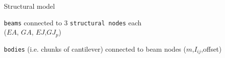 \documentclass[10pt,t]{beamer}
\begin{document}
\begin{frame}{Structural model}

  \vspace{0.5cm}
  \begin{description}
  \itemsep 10pt

  \item[structural elements] \textcolor{dorange}{\texttt{beams}} connected to 3 \textcolor{dorange}{\texttt{structural nodes}} each \\ ($EA$, $GA$, $EJ$,$GJ_p$)\\
  \item[inertial elements] \textcolor{dorange}{\texttt{bodies}} (i.e. chunks of cantilever) connected to beam nodes ($m$,$I_{ij}$,offset)\\
  \end{description}    


\begin{figure}[htbp!]
    \begin{subfigure}[t]{.486\textwidth}
	    \centering
\end{subfigure}
\end{figure}
\end{frame}
\end{document}
